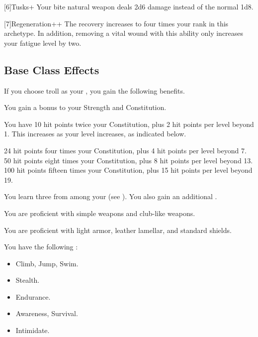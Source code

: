     [6]{Tusks+} Your bite natural weapon deals 2d6 damage instead of the normal 1d8.

    [7]{Regeneration++} The recovery increases to four times your rank in this archetype.
      In addition, removing a vital wound with this ability only increases your fatigue level by two.

  \subsection{Base Class Effects}
    If you choose troll as your , you gain the following benefits.

      You gain a  bonus to your Strength and Constitution.

      You have 10 hit points \add twice your Constitution, plus 2 hit points per level beyond 1.
      This increases as your level increases, as indicated below.
      \begin{itemize}
         24 hit points \add four times your Constitution, plus 4 hit points per level beyond 7.
         50 hit points \add eight times your Constitution, plus 8 hit points per level beyond 13.
         100 hit points \add fifteen times your Constitution, plus 15 hit points per level beyond 19.
      \end{itemize}

      You learn three  from among your  (see ).
      You also gain an additional .

      You are proficient with simple weapons and club-like weapons.

      You are proficient with light armor, leather lamellar, and standard shields.

      You have the following :

      \begin{itemize}
        \item {} Climb, Jump, Swim.
        \item {} Stealth.
        \item {} Endurance.
        \item {} Awareness, Survival.
        \item {} Intimidate.
      \end{itemize}

